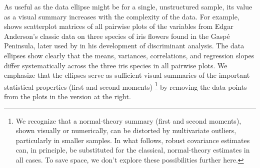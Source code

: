 As useful as the data ellipse might be for a single, unstructured
sample, its value as a visual summary increases
with the complexity of the data.
For example,  shows  scatterplot matrices
of all pairwise plots of the variables from Edgar Anderson's \citeyear{Anderson:35}
classic
data on three species of iris flowers found in the Gasp\'{e} Peninsula,
later used by \citet{Fisher:36} in his development of discriminant analysis.
The data ellipses show clearly that the means, variances, correlations,
and regression slopes differ systematically across the three iris species
in all pairwise plots.
We emphasize that the ellipses serve as sufficient visual summaries of the important
statistical properties (first and second moments)%
\footnote{
We recognize that a normal-theory summary (first and second moments),
shown visually or numerically, can be distorted
by multivariate outliers, particularly in smaller samples.
In what follows,
robust covariance estimates can, in principle, be substituted
for the classical, normal-theory estimates in all cases.
To save space, we don't explore these possibilities further here.
}
by removing the data points
from the plots in the version at the right.


